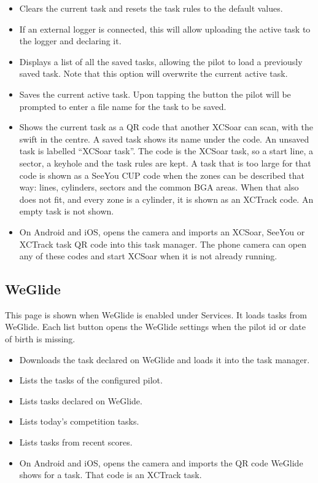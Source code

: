 \begin{itemize}
\item [\bmenuw{New Task}] Clears the current task and resets the task rules to
  the default values.
\item [\bmenuw{Declare}] If an external logger is connected, this will allow
  uploading the  active task to the logger and declaring it.
\item [\bmenuw{Browse}] Displays a list of all the saved tasks, allowing the
  pilot to load a previously saved task.  Note that this option will overwrite
  the current active task.
\item [\bmenuw{Save}] Saves the current active task.  Upon tapping the
   button the pilot will be prompted to enter a file name for the
  task to be saved.
\item [\bmenuw{Show QR Code}] Shows the current task as a QR code that
  another XCSoar can scan, with the swift in the centre.  A saved
  task shows its name under the code.  An unsaved task is labelled
  ``XCSoar task''.  The code is the XCSoar task, so a start line, a
  sector, a keyhole and the task rules are kept.  A task that is too
  large for that code is shown as a SeeYou CUP code when the zones
  can be described that way: lines, cylinders, sectors and the
  common BGA areas.  When that also does not fit, and every zone is a
  cylinder, it is shown as an XCTrack code.  An empty task is not
  shown.
\item [\bmenuw{Scan QR Code}] On Android and iOS, opens the camera and
  imports an XCSoar, SeeYou or XCTrack task QR code into this task manager.
  The phone camera can open any of these codes and start XCSoar when
  it is not already running.
\end{itemize}

\subsection*{WeGlide}
This page is shown when WeGlide is enabled under Services.  It loads
 tasks from WeGlide.  Each list button opens
the WeGlide settings when the pilot id or date of birth is missing.

\begin{itemize}
\item [\bmenuw{Download Declaration}] Downloads the task declared on
  WeGlide and loads it into the task manager.
\item [\bmenuw{My Tasks}] Lists the tasks of the configured pilot.
\item [\bmenuw{Declared Tasks}] Lists tasks declared on WeGlide.
\item [\bmenuw{Competitions Today}] Lists today's competition tasks.
\item [\bmenuw{Recent Scores}] Lists tasks from recent scores.
\item [\bmenuw{Scan QR Code}] On Android and iOS, opens the camera and
  imports the QR code WeGlide shows for a task.  That code is an XCTrack task.
\end{itemize}

